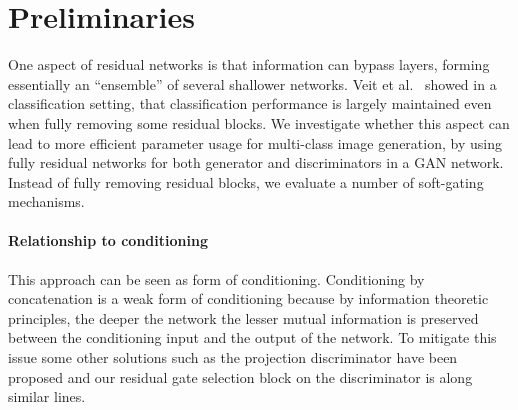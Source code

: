 \section{Preliminaries}
\newcommand{\addSubFigHalf}[3]{\begin{subfigure}[t]{.45\linewidth}
   \texttt{[image: \#1]}
   \caption{#2}\label{#3}\end{subfigure}
}


One aspect of residual networks is that information can bypass layers, forming essentially an ``ensemble'' of several shallower networks.
Veit et al.~\cite{veit2016residual} showed in a classification setting, that classification performance is largely maintained even when fully removing some residual blocks.
We investigate whether this aspect can lead to more efficient parameter usage for multi-class image generation, by using fully residual networks for both generator and discriminators in a GAN network.
Instead of fully removing residual blocks, we evaluate a number of soft-gating mechanisms.


\paragraph{Relationship to conditioning}
This approach can be seen as form of conditioning. 
Conditioning by concatenation is a weak form of conditioning because by information theoretic principles, the deeper the network the lesser mutual information is preserved between the conditioning input and the output of the network. To mitigate this issue some other solutions such as the projection discriminator \cite{miyato2018cgans} have been proposed and our residual gate selection block on the discriminator is along similar lines. 


